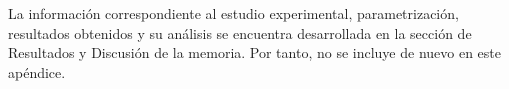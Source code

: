 
La información correspondiente al estudio experimental, parametrización, resultados obtenidos y su análisis se encuentra desarrollada en la sección de Resultados y Discusión de la memoria. Por tanto, no se incluye de nuevo en este apéndice.
